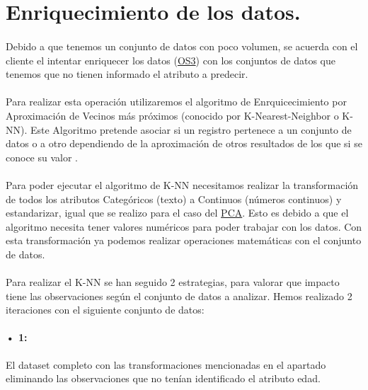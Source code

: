 \section{Enriquecimiento de los datos.}
\label{section:knn}

\paragraph{}
Debido a que tenemos un conjunto de datos con poco volumen, se acuerda con el cliente el intentar enriquecer los datos (\hyperref[os:OS3]{OS3}) con los conjuntos de datos que tenemos que no tienen informado el atributo a predecir.

\paragraph{}
Para realizar esta operación utilizaremos el algoritmo de Enrquicecimiento por Aproximación de Vecinos más próximos (conocido por K-Nearest-Neighbor o K-NN). Este Algoritmo pretende asociar si un registro pertenece a un conjunto de datos o a otro dependiendo de la aproximación de otros resultados de los que si se conoce su valor \cite{ref:knn_def}.

\paragraph{}
Para poder ejecutar el algoritmo de K-NN necesitamos realizar la transformación de todos los
atributos Categóricos (texto) a Continuos (números continuos) y estandarizar, igual que se realizo para el caso del \hyperref[section:pca_standar]{PCA}. Esto es debido a que el algoritmo necesita tener valores numéricos para poder trabajar con los datos\cite{ref:knn_scaling}. Con esta transformación ya podemos realizar operaciones matemáticas con el conjunto de datos.

\paragraph{}
Para realizar el K-NN se han seguido 2 estrategias, para valorar que impacto tiene las observaciones según el conjunto de datos a analizar. Hemos realizado 2 iteraciones con el siguiente conjunto de datos:

\paragraph{• 1: } El dataset completo con las transformaciones mencionadas en el apartado  eliminando las observaciones que no tenían identificado el atributo edad.

